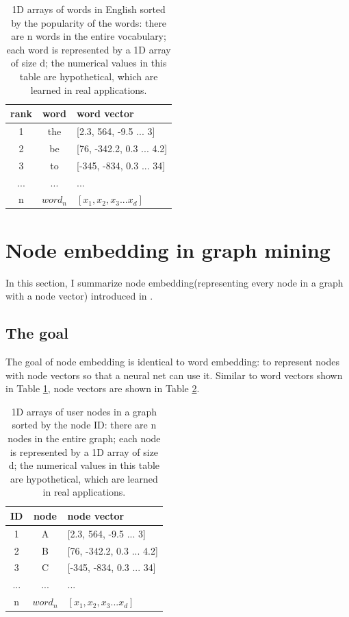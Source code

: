 \documentclass{article}
\begin{document}
\begin{table}[h]
	\centering
	\begin{tabularx}{0.5\textwidth}{|c|c|X|} \hline
		rank & word & word vector \\ \hline
		1 & the & [2.3, 564, -9.5 ... 3] \\ \hline
		2 & be & [76, -342.2, 0.3 ... 4.2] \\ \hline
		3 & to & [-345, -834, 0.3 ... 34] \\ \hline
		... & ... & ... \\ \hline
		n & $ word_n $ & $ [x_1, x_2, x_3 ... x_d] $ \\ \hline
	\end{tabularx}
	\caption{1D arrays of words in English sorted by the popularity of the words: there are n words in the entire vocabulary; each word is represented by a 1D array of size d; the numerical values in this table are hypothetical, which are learned in real applications.}
	\label{tab:word}
\end{table}

\section{Node embedding in graph mining}

In this section, I summarize node embedding(representing every node in a graph with a node vector) introduced in \cite{perozzi2014deepwalk}.

\subsection{The goal}

The goal of node embedding is identical to word embedding: to represent nodes with node vectors so that a neural net can use it. Similar to word vectors shown in Table \ref{tab:word}, node vectors are shown in Table \ref{tab:node}.

\begin{table}[h]
	\centering
	\begin{tabularx}{0.5\textwidth}{|c|c|X|} \hline
		ID & node & node vector \\ \hline
		1 & A & [2.3, 564, -9.5 ... 3] \\ \hline
		2 & B & [76, -342.2, 0.3 ... 4.2] \\ \hline
		3 & C & [-345, -834, 0.3 ... 34] \\ \hline
		... & ... & ... \\ \hline
		n & $ word_n $ & $ [x_1, x_2, x_3 ... x_d] $ \\ \hline
	\end{tabularx}
	\caption{1D arrays of user nodes in a graph sorted by the node ID: there are n nodes in the entire graph; each node is represented by a 1D array of size d; the numerical values in this table are hypothetical, which are learned in real applications.}
	\label{tab:node}
\end{table}
\end{document}
